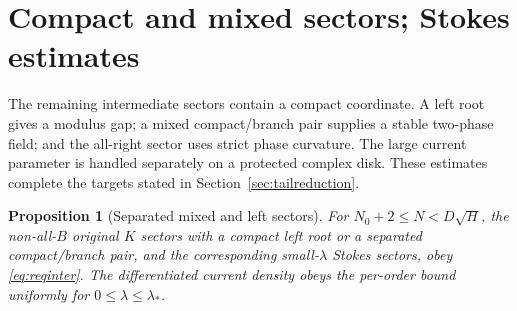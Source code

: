 \documentclass[11pt]{article}
\numberwithin{equation}{section}
\newtheorem{proposition}[theorem]{Proposition}
\theoremstyle{definition}
\begin{document}
\section{Compact and mixed sectors; Stokes estimates}
\label{sec:sectors}

The remaining intermediate sectors contain a compact coordinate.
A left root gives a modulus gap; a mixed compact/branch pair supplies
a stable two-phase field; and the all-right sector uses strict phase
curvature. The large current parameter is handled separately on a
protected complex disk. These estimates complete the targets stated
in Section~\ref{sec:tailreduction}.
\begin{proposition}[Separated mixed and left sectors]\label{prop:mixed}
For \(N_0+2\le N<D\sqrt H\), the non-all-\(B\) original \(K\)
sectors with a compact left root or a separated compact/branch
pair, and the corresponding small-\(\lambda\) Stokes sectors,
obey \eqref{eq:reqinter}. The differentiated current density
obeys the per-order bound uniformly for \(0\le\lambda\le\lambda_*\).
\end{proposition}
\end{document}
